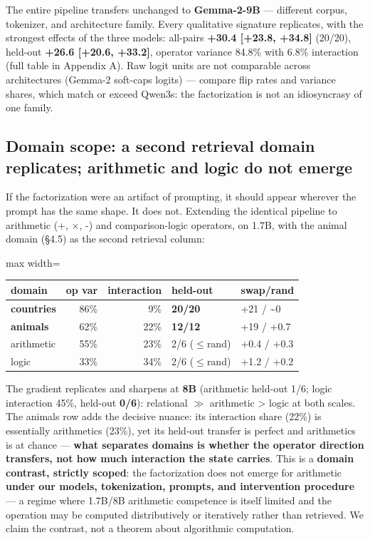 The entire pipeline transfers unchanged to \textbf{Gemma-2-9B} ---
different corpus, tokenizer, and architecture family. Every qualitative
signature replicates, with the strongest effects of the three models:
all-pairs \textbf{+30.4 {[}+23.8, +34.8{]}} (20/20), held-out
\textbf{+26.6 {[}+20.6, +33.2{]}}, operator variance 84.8\% with 6.8\%
interaction (full table in Appendix A). Raw logit units are not
comparable across architectures (Gemma-2 soft-caps logits) --- compare
flip rates and variance shares, which match or exceed
Qwen3\textquotesingle s: the factorization is not an idiosyncrasy of one
family.

\subsection{Domain scope: a second retrieval domain replicates;
arithmetic and logic do not
emerge}

If the factorization were an artifact of prompting, it should appear
wherever the prompt has the same shape. It does not. Extending the
identical pipeline to arithmetic (+, \ensuremath{\times}, -) and comparison-logic
operators, on 1.7B, with the animal domain (\S{}4.5) as the second
retrieval column:

{
\begin{table}[H]
\centering\small
\begin{adjustbox}{max width=\columnwidth}
\begin{tabular}{lrrll}
\toprule
domain & op var & interaction & held-out & swap/rand \\
\midrule
\textbf{countries} & 86\% & 9\% & \textbf{20/20} & +21 /
\textasciitilde0 \\
\textbf{animals} & 62\% & 22\% & \textbf{12/12} & +19 / +0.7 \\
arithmetic & 55\% & 23\% & 2/6 (\ensuremath{\leq}rand) & +0.4 / +0.3 \\
logic & 33\% & 34\% & 2/6 (\ensuremath{\leq}rand) & +1.2 / +0.2 \\
\bottomrule
\end{tabular}
\end{adjustbox}
\end{table}
}

The gradient replicates and sharpens at \textbf{8B} (arithmetic held-out
1/6; logic interaction 45\%, held-out \textbf{0/6}): relational \ensuremath{\gg}
arithmetic \textgreater{} logic at both scales. The animals row adds the
decisive nuance: its interaction share (22\%) is essentially
arithmetic\textquotesingle s (23\%), yet its held-out transfer is
perfect and arithmetic\textquotesingle s is at chance --- \textbf{what
separates domains is whether the operator direction transfers, not how
much interaction the state carries}. This is a \textbf{domain contrast,
strictly scoped}: the factorization does not emerge for arithmetic
\textbf{under our models, tokenization, prompts, and intervention
procedure} --- a regime where 1.7B/8B arithmetic competence is itself
limited and the operation may be computed distributively or iteratively
rather than retrieved. We claim the contrast, not a theorem about
algorithmic computation.

